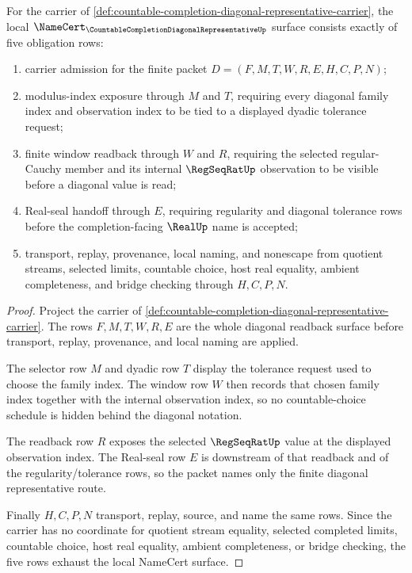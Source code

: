 \begin{theorem}
\label{thm:countable-completion-diagonal-representative-namecert-obligations}
For the carrier of \autoref{def:countable-completion-diagonal-representative-carrier}, the local $\NameCert_{\CountableCompletionDiagonalRepresentativeUp}$ surface consists exactly of five obligation rows:
\begin{enumerate}
\item carrier admission for the finite packet $D=(F,M,T,W,R,E,H,C,P,N)$;
\item modulus-index exposure through $M$ and $T$, requiring every diagonal family index and observation index to be tied to a displayed dyadic tolerance request;
\item finite window readback through $W$ and $R$, requiring the selected regular-Cauchy member and its internal $\RegSeqRatUp$ observation to be visible before a diagonal value is read;
\item Real-seal handoff through $E$, requiring regularity and diagonal tolerance rows before the completion-facing $\RealUp$ name is accepted;
\item transport, replay, provenance, local naming, and nonescape from quotient streams, selected limits, countable choice, host real equality, ambient completeness, and bridge checking through $H,C,P,N$.
\end{enumerate}
\end{theorem}
\begin{proof}
Project the carrier of \autoref{def:countable-completion-diagonal-representative-carrier}. The rows $F,M,T,W,R,E$ are the whole diagonal readback surface before transport, replay, provenance, and local naming are applied.

The selector row $M$ and dyadic row $T$ display the tolerance request used to choose the family index. The window row $W$ then records that chosen family index together with the internal observation index, so no countable-choice schedule is hidden behind the diagonal notation.

The readback row $R$ exposes the selected $\RegSeqRatUp$ value at the displayed observation index. The Real-seal row $E$ is downstream of that readback and of the regularity/tolerance rows, so the packet names only the finite diagonal representative route.

Finally $H,C,P,N$ transport, replay, source, and name the same rows. Since the carrier has no coordinate for quotient stream equality, selected completed limits, countable choice, host real equality, ambient completeness, or bridge checking, the five rows exhaust the local NameCert surface.
\end{proof}


